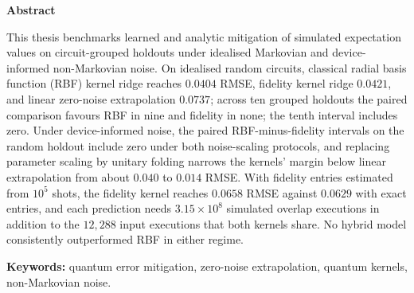 \begin{flushright}
\huge{\textbf{Abstract}}
\end{flushright}

This thesis benchmarks learned and analytic mitigation of simulated expectation
values on circuit-grouped holdouts under idealised Markovian and device-informed
non-Markovian noise. On idealised random circuits, classical radial basis function (RBF) kernel ridge
reaches $0.0404$ RMSE, fidelity kernel ridge $0.0421$, and linear zero-noise
extrapolation $0.0737$; across ten grouped holdouts the paired comparison favours RBF in nine and fidelity in none; the tenth interval includes zero. Under device-informed noise, the paired
RBF-minus-fidelity intervals on the random holdout include zero under both
noise-scaling protocols, and replacing parameter scaling by unitary folding
narrows the kernels' margin below linear extrapolation from about $0.040$ to
$0.014$ RMSE. With fidelity entries estimated from $10^5$ shots, the fidelity
kernel reaches $0.0658$ RMSE against $0.0629$ with exact entries, and each
prediction needs $3.15\times10^8$ simulated overlap executions in addition to
the $12{,}288$ input executions that both kernels share. No hybrid model
consistently outperformed RBF in either regime.

\vspace{0.4cm}
\noindent\textbf{Keywords:} quantum error mitigation, zero-noise extrapolation,
quantum kernels, non-Markovian noise.
